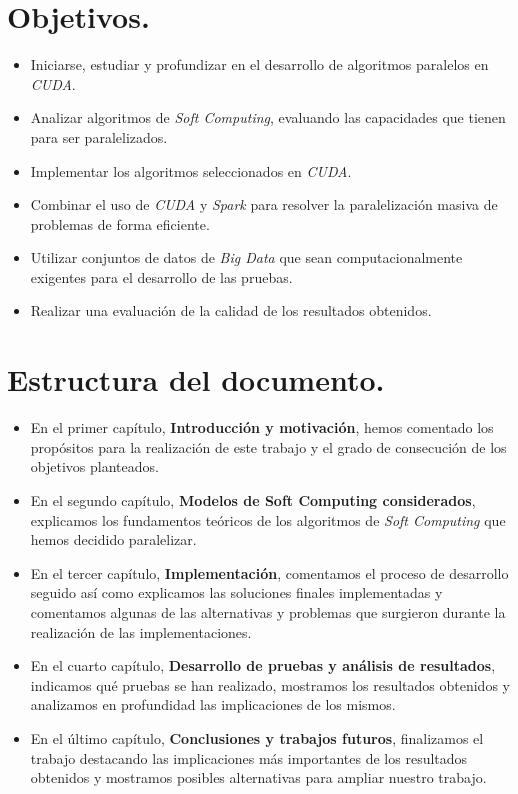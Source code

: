 \documentclass[a4paper,oneside,11pt,titlepage]{book}
\begin{document}
\section{Objetivos.}
\begin{itemize}
    \item Iniciarse, estudiar y profundizar en el desarrollo de algoritmos paralelos en \textit{CUDA}.
    \item Analizar algoritmos de \textit{Soft Computing}, evaluando las capacidades que tienen para ser paralelizados.
    \item Implementar los algoritmos seleccionados en \textit{CUDA}.
    \item Combinar el uso de \textit{CUDA} y \textit{Spark} para resolver la paralelización masiva de problemas de forma eficiente.
    \item Utilizar conjuntos de datos de \textit{Big Data} que sean computacionalmente exigentes para el desarrollo de las pruebas.
    \item Realizar una evaluación de la calidad de los resultados obtenidos.
\end{itemize}

\section{Estructura del documento.}

\begin{itemize}
    \item En el primer capítulo, \textbf{Introducción y motivación}, hemos comentado los propósitos para la realización de este trabajo y el grado de consecución de los objetivos planteados.
    \item En el segundo capítulo, \textbf{Modelos de Soft Computing considerados}, explicamos los fundamentos teóricos de los algoritmos de \textit{Soft Computing} que hemos decidido paralelizar.
    \item En el tercer capítulo, \textbf{Implementación}, comentamos el proceso de desarrollo seguido así como explicamos las soluciones finales implementadas y comentamos algunas de las alternativas y problemas que surgieron durante la realización de las implementaciones.
    \item En el cuarto capítulo, \textbf{Desarrollo de pruebas y análisis de resultados}, indicamos qué pruebas se han realizado, mostramos los resultados obtenidos y analizamos en profundidad las implicaciones de los mismos.
    \item En el último capítulo, \textbf{Conclusiones y trabajos futuros}, finalizamos el trabajo destacando las implicaciones más importantes de los resultados obtenidos y mostramos posibles alternativas para ampliar nuestro trabajo.
\end{itemize}
\end{document}
